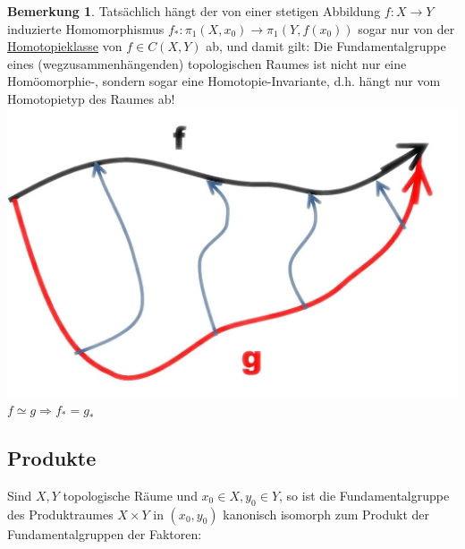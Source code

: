 \documentclass[a4paper,11pt,notitlepage]{report}
\theoremstyle{definition}
\newtheorem{remark}{Bemerkung}[chapter]
\begin{document}
\begin{remark}
	Tatsächlich hängt der von einer stetigen Abbildung $f \colon X \rightarrow Y$ induzierte Homomorphismus $f_* \colon \pi_1(X,x_0) \rightarrow \pi_1(Y,f(x_0))$ sogar nur von der \underline{Homotopieklasse} von $f \in C(X,Y)$ ab, und damit gilt:
	\newline
	Die Fundamentalgruppe eines (wegzusammenhängenden) topologischen Raumes ist nicht nur eine Homöomorphie-, sondern sogar eine Homotopie-Invariante, d.h. hängt nur vom Homotopietyp des Raumes ab! \newline
	\includegraphics[scale=0.4]{images/f_g_homotop.png}
	\newline
	$f \simeq g \Rightarrow f_* = g_*$
\end{remark}

\newpage
\subsection{Produkte}
\begin{theorem}
	Sind $X,Y$ topologische Räume und $x_0 \in X, y_0 \in Y$, so ist die Fundamentalgruppe des Produktraumes $X \times Y$ in $(x_0,y_0)$ kanonisch isomorph zum Produkt der Fundamentalgruppen der Faktoren:
	\begin{center}
	\end{center}
\end{theorem}
\end{document}

